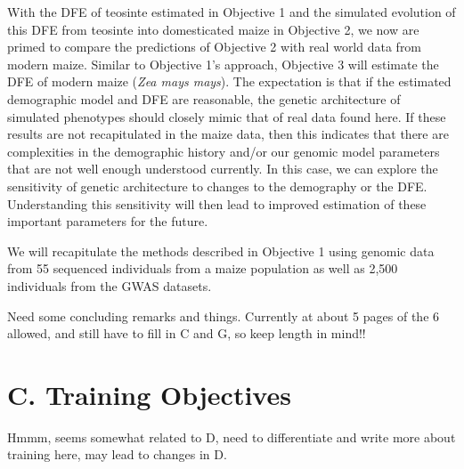 {With the DFE of teosinte estimated in Objective 1 and the simulated evolution of this DFE from teosinte into domesticated maize in Objective 2, we now are primed to compare the predictions of Objective 2 with real world data from modern maize. Similar to Objective 1's approach, Objective 3 will estimate the DFE of modern maize (\emph{Zea mays mays}). The expectation is that if the estimated demographic model and DFE are reasonable, the genetic architecture of simulated phenotypes should closely mimic that of real data found here. If these results are not recapitulated in the maize data, then this indicates that there are complexities in the demographic history and\//or our genomic model parameters that are not well enough understood currently. In this case, we can explore the sensitivity of genetic architecture to changes to the demography or the DFE. Understanding this sensitivity will then lead to improved estimation of these important parameters for the future.

We will recapitulate the methods described in Objective 1 using genomic data from 55 sequenced individuals from a maize population as well as 2,500 individuals from the GWAS datasets.

Need some concluding remarks and things. Currently at about 5 pages of the 6 allowed, and still have to fill in C and G, so keep length in mind!!
	
	
	
	
	
	
	
	
\section*{C. Training Objectives}

Hmmm, seems somewhat related to D, need to differentiate and write more about training here, may lead to changes in D. 

}
